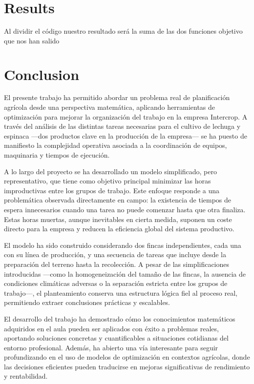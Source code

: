 \chapter*{Results}
Al dividir el código nuestro resultado será la suma de las dos funciones objetivo que nos han salido

\chapter*{Conclusion}
El presente trabajo ha permitido abordar un problema real de planificación agrícola desde una perspectiva matemática,
aplicando herramientas de optimización para mejorar la organización del trabajo en la empresa Intercrop.
A través del análisis de las distintas tareas necesarias para el cultivo de lechuga y espinaca —dos productos clave en la producción de la empresa—
se ha puesto de manifiesto la complejidad operativa asociada a la coordinación de equipos, maquinaria y tiempos de ejecución.

A lo largo del proyecto se ha desarrollado un modelo simplificado, pero representativo,
que tiene como objetivo principal minimizar las horas improductivas entre los grupos de trabajo.
Este enfoque responde a una problemática observada directamente en campo:
la existencia de tiempos de espera innecesarios cuando una tarea no puede comenzar hasta que otra finaliza.
Estas horas muertas, aunque inevitables en cierta medida, suponen un coste directo para la empresa y reducen la eficiencia global del sistema productivo.

El modelo ha sido construido considerando dos fincas independientes, cada una con su línea de producción,
y una secuencia de tareas que incluye desde la preparación del terreno hasta la recolección.
A pesar de las simplificaciones introducidas —como la homogeneización del tamaño de las fincas,
la ausencia de condiciones climáticas adversas o la separación estricta entre los grupos de trabajo—, el planteamiento conserva una estructura lógica fiel al proceso real,
permitiendo extraer conclusiones prácticas y escalables.

El desarrollo del trabajo ha demostrado cómo los conocimientos matemáticos adquiridos en el aula pueden ser aplicados con éxito a problemas reales,
aportando soluciones concretas y cuantificables a situaciones cotidianas del entorno profesional.
Además, ha abierto una vía interesante para seguir profundizando en el uso de modelos de optimización en contextos agrícolas,
donde las decisiones eficientes pueden traducirse en mejoras significativas de rendimiento y rentabilidad.

